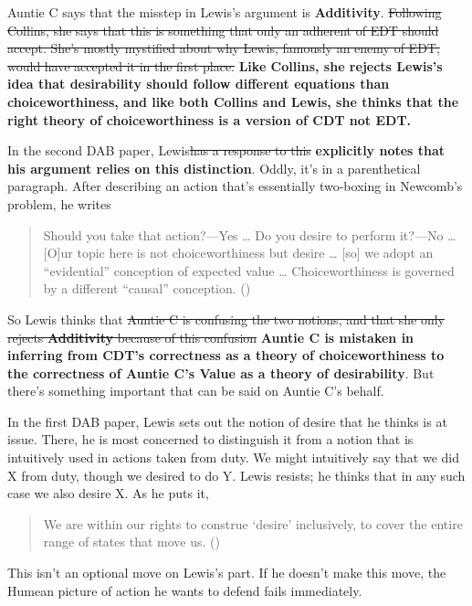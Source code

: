 \documentclass[
  11pt,
  letterpaper,
  DIV=11,
  numbers=noendperiod,
  twoside]{scrartcl}
\begin{document}
Auntie C says that the misstep in Lewis's argument is
\textbf{Additivity}. \sout{Following Collins, she says that this is
something that only an adherent of EDT should accept. She's mostly
mystified about why Lewis, famously an enemy of EDT, would have accepted
it in the first place.} {\bfseries\boldmath{}Like Collins, she rejects
Lewis's idea that desirability should follow different equations than
choiceworthiness, and like both Collins and Lewis, she thinks that the
right theory of choiceworthiness is a version of CDT not EDT.}

In the second DAB paper, Lewis\sout{has a response to this}
{\bfseries\boldmath{}explicitly notes that his argument relies on this
distinction}. Oddly, it's in a parenthetical paragraph. After describing
an action that's essentially two-boxing in Newcomb's problem, he writes

\begin{quote}
Should you take that action?---Yes \ldots{} Do you desire to perform
it?---No \ldots{} {[}O{]}ur topic here is not choiceworthiness but
desire \ldots{} {[}so{]} we adopt an ``evidential'' conception of
expected value \ldots{} Choiceworthiness is governed by a different
``causal'' conception. ()
\end{quote}

So Lewis thinks that \sout{Auntie C is confusing the two notions, and
that she only rejects \textbf{Additivity} because of this confusion}
{\bfseries\boldmath{}Auntie C is mistaken in inferring from CDT's
correctness as a theory of choiceworthiness to the correctness of
\textbf{Auntie C's Value} as a theory of desirability}. But there's
something important that can be said on Auntie C's behalf.

In the first DAB paper, Lewis sets out the notion of desire that he
thinks is at issue. There, he is most concerned to distinguish it from a
notion that is intuitively used in actions taken from duty. We might
intuitively say that we did X from duty, though we desired to do Y.
Lewis resists; he thinks that in any such case we also desire X. As he
puts it,

\begin{quote}
We are within our rights to construe `desire' inclusively, to cover the
entire range of states that move us. ()
\end{quote}

This isn't an optional move on Lewis's part. If he doesn't make this
move, the Humean picture of action he wants to defend fails immediately.
\end{document}
